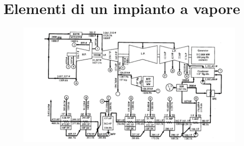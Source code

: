 \section{Elementi di un impianto a vapore}
\begin{figure}[H]
	\centering
	\includegraphics[width=1\linewidth]{immagini/impiantovapore1}
	\label{fig:impiantovapore1}
\end{figure}
